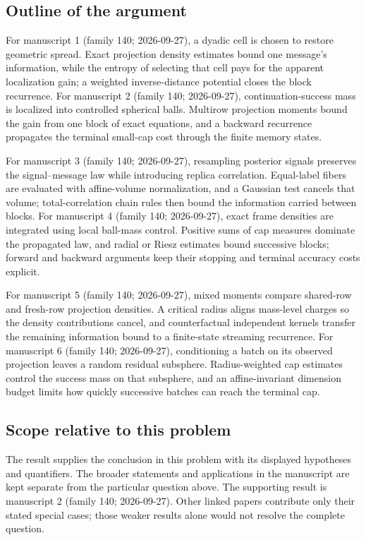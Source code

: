 \documentclass[11pt]{article}
\begin{document}
\subsection{Outline of the argument}
For manuscript 1 (family 140; 2026-09-27), a dyadic cell is chosen to restore geometric spread. Exact projection density estimates bound one message's information, while the entropy of selecting that cell pays for the apparent localization gain; a weighted inverse-distance potential closes the block recurrence. For manuscript 2 (family 140; 2026-09-27), continuation-success mass is localized into controlled spherical balls. Multirow projection moments bound the gain from one block of exact equations, and a backward recurrence propagates the terminal small-cap cost through the finite memory states.

For manuscript 3 (family 140; 2026-09-27), resampling posterior signals preserves the signal--message law while introducing replica correlation. Equal-label fibers are evaluated with affine-volume normalization, and a Gaussian test cancels that volume; total-correlation chain rules then bound the information carried between blocks. For manuscript 4 (family 140; 2026-09-27), exact frame densities are integrated using local ball-mass control. Positive sums of cap measures dominate the propagated law, and radial or Riesz estimates bound successive blocks; forward and backward arguments keep their stopping and terminal accuracy costs explicit.

For manuscript 5 (family 140; 2026-09-27), mixed moments compare shared-row and fresh-row projection densities. A critical radius aligns mass-level charges so the density contributions cancel, and counterfactual independent kernels transfer the remaining information bound to a finite-state streaming recurrence. For manuscript 6 (family 140; 2026-09-27), conditioning a batch on its observed projection leaves a random residual subsphere. Radius-weighted cap estimates control the success mass on that subsphere, and an affine-invariant dimension budget limits how quickly successive batches can reach the terminal cap.

\subsection{Scope relative to this problem}
The result supplies the conclusion in this problem with its displayed hypotheses and quantifiers. The broader statements and applications in the manuscript are kept separate from the particular question above. The supporting result is manuscript 2 (family 140; 2026-09-27). Other linked papers contribute only their stated special cases; those weaker results alone would not resolve the complete question.
\end{document}
